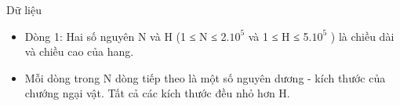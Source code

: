 Dữ liệu
\begin{itemize}
	\item Dòng 1: Hai số nguyên N và H (1 ≤ N ≤ 2.$10^{5}$ và 1 ≤ H ≤ 5.$10^{5}$ ) là chiều dài và chiều cao của hang.
	\item Mỗi dòng trong N dòng tiếp theo là một số nguyên dương - kích thước của chướng ngại vật. Tất cả các kích thước đều nhỏ hơn H.
\end{itemize}